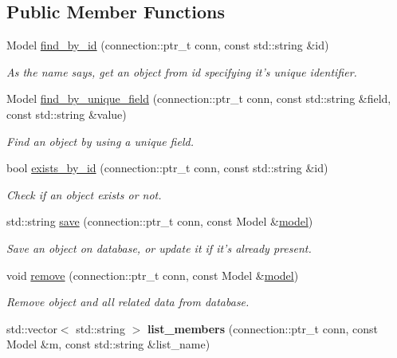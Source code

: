 \subsection*{Public Member Functions}
\begin{DoxyCompactItemize}
\item 
Model \hyperlink{classredis3m_1_1patterns_1_1orm_a3e96c9961e2445ff7d399f7c4c131d90}{find\-\_\-by\-\_\-id} (connection\-::ptr\-\_\-t conn, const std\-::string \&id)
\begin{DoxyCompactList}\small\item\em As the name says, get an object from id specifying it's unique identifier. \end{DoxyCompactList}\item 
Model \hyperlink{classredis3m_1_1patterns_1_1orm_a8e3ef3bbd7a44779425c0cd603e8ffc5}{find\-\_\-by\-\_\-unique\-\_\-field} (connection\-::ptr\-\_\-t conn, const std\-::string \&field, const std\-::string \&value)
\begin{DoxyCompactList}\small\item\em Find an object by using a unique field. \end{DoxyCompactList}\item 
bool \hyperlink{classredis3m_1_1patterns_1_1orm_a68ed176f8848c5c30612a8d29fb341d6}{exists\-\_\-by\-\_\-id} (connection\-::ptr\-\_\-t conn, const std\-::string \&id)
\begin{DoxyCompactList}\small\item\em Check if an object exists or not. \end{DoxyCompactList}\item 
std\-::string \hyperlink{classredis3m_1_1patterns_1_1orm_ae9618fa5fc90c05ad75dab2bd8979a66}{save} (connection\-::ptr\-\_\-t conn, const Model \&\hyperlink{classredis3m_1_1patterns_1_1model}{model})
\begin{DoxyCompactList}\small\item\em Save an object on database, or update it if it's already present. \end{DoxyCompactList}\item 
void \hyperlink{classredis3m_1_1patterns_1_1orm_a821adbf0bafae4563104977c7982882a}{remove} (connection\-::ptr\-\_\-t conn, const Model \&\hyperlink{classredis3m_1_1patterns_1_1model}{model})
\begin{DoxyCompactList}\small\item\em Remove object and all related data from database. \end{DoxyCompactList}\item 
\hypertarget{classredis3m_1_1patterns_1_1orm_aa8b6e4d42bef93974070001ec4c5ab60}{std\-::vector$<$ std\-::string $>$ {\bfseries list\-\_\-members} (connection\-::ptr\-\_\-t conn, const Model \&m, const std\-::string \&list\-\_\-name)}\label{classredis3m_1_1patterns_1_1orm_aa8b6e4d42bef93974070001ec4c5ab60}


\end{DoxyCompactItemize}

